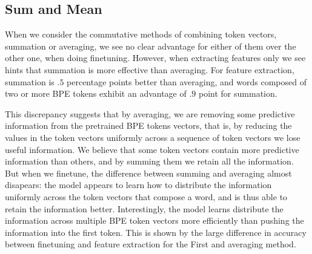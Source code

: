 \documentclass[11pt]{article}
\begin{document}
    \subsection{Sum and Mean}
                When we consider the commutative methods of combining
     token vectors, summation or averaging, we see no clear advantage
     for either of them over the other one, when doing
     finetuning. However, when extracting features only we see hints
     that summation is more effective than averaging. For feature
     extraction, summation is $.5$ percentage points better than
     averaging, and words composed of two or more BPE tokens exhibit
     an advantage of $.9$ point for summation.
    
                This discrepancy suggests that by averaging, we are
     removing some predictive information from the pretrained BPE
     tokens vectors, that is, by reducing the values in the token vectors
     uniformly across a sequence of token vectors we lose useful
     information.
        We believe that some token vectors contain more predictive
     information than others, and by summing them we retain all the
     information.
                     But when we finetune, the difference between
     summing and averaging almost disapears: the model appears to learn
     how to distribute the information uniformly across the token vectors
     that compose a word, and is thus able to retain the information
     better. Interestingly, the model learns distribute the
     information across multiple BPE token vectors more efficiently than
     pushing the information into the first token. This is shown by
     the large difference in accuracy between finetuning and feature extraction
     for the First and averaging method.
   
\end{document}
